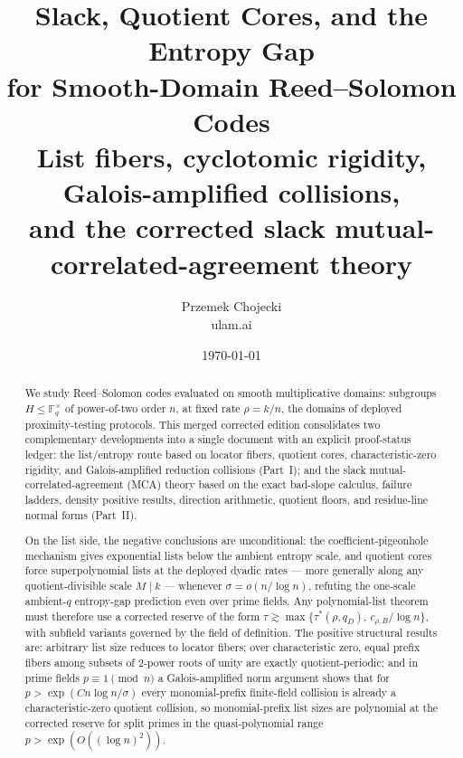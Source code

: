 \documentclass[11pt]{article}
\title{Slack, Quotient Cores, and the Entropy Gap\\ for Smooth-Domain Reed--Solomon Codes\\\large List fibers, cyclotomic rigidity, Galois-amplified collisions,\\\large and the corrected slack mutual-correlated-agreement theory}
\author{Przemek Chojecki\\ \small ulam.ai}
\date{\today}
\theoremstyle{definition}
\newcommand{\F}{\mathbb F}
\newcommand{\taustar}{\tau^{*}}
\begin{document}
\maketitle

\begin{abstract}
We study Reed--Solomon codes evaluated on smooth multiplicative domains: subgroups $H\le\F_q^\times$ of power-of-two order $n$, at fixed rate $\rho=k/n$, the domains of deployed proximity-testing protocols.  This merged corrected edition consolidates two complementary developments into a single document with an explicit proof-status ledger: the list/entropy route based on locator fibers, quotient cores, characteristic-zero rigidity, and Galois-amplified reduction collisions (Part~I); and the slack mutual-correlated-agreement (MCA) theory based on the exact bad-slope calculus, failure ladders, density positive results, direction arithmetic, quotient floors, and residue-line normal forms (Part~II).

On the list side, the negative conclusions are unconditional: the coefficient-pigeonhole mechanism gives exponential lists below the ambient entropy scale, and quotient cores force superpolynomial lists at the deployed dyadic rates --- more generally along any quotient-divisible scale $M\mid k$ --- whenever $\sigma=o(n/\log n)$, refuting the one-scale ambient-$q$ entropy-gap prediction even over prime fields.  Any polynomial-list theorem must therefore use a corrected reserve of the form $\tau\gtrsim\max\{\taustar(\rho,q_D),\,c_{\rho,B}/\log n\}$, with subfield variants governed by the field of definition.  The positive structural results are: arbitrary list size reduces to locator fibers; over characteristic zero, equal prefix fibers among subsets of $2$-power roots of unity are exactly quotient-periodic; and in prime fields $p\equiv1\pmod n$ a Galois-amplified norm argument shows that for $p>\exp(Cn\log n/\sigma)$ every monomial-prefix finite-field collision is already a characteristic-zero quotient collision, so monomial-prefix list sizes are polynomial at the corrected reserve for split primes in the quasi-polynomial range $p>\exp(O((\log n)^2))$.


\end{abstract}
\end{document}
